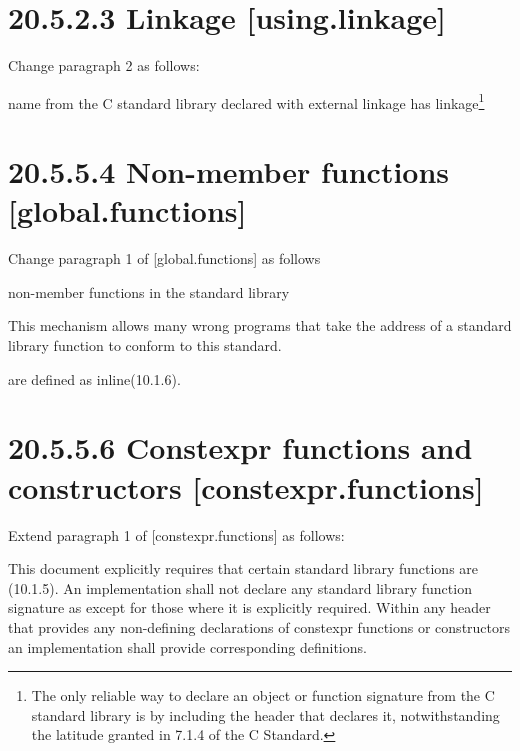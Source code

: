 \documentclass[ebook,11pt,article]{memoir}
\begin{document}
\section{20.5.2.3 Linkage [using.linkage]}
Change paragraph 2 as follows:

 name from the C standard library declared with
external linkage has
linkage\footnote{The only reliable way to declare an object or
function signature from the C standard library is by including the header that
declares it, notwithstanding the latitude granted in 7.1.4 of the C
Standard.}


\section{20.5.5.4 Non-member functions [global.functions]}

Change paragraph 1 of [global.functions] as follows

\pnum
{}
non-member
functions in the \Cpp{} standard library 
\begin{addedblock}
\begin{note}
This mechanism allows many wrong programs that take the address of a 
standard library function to conform to this standard.
\end{note}
\end{addedblock}
are defined as
inline(10.1.6).%

\section{20.5.5.6 
Constexpr functions and constructors
[constexpr.functions]}

Extend paragraph 1 of [constexpr.functions] as follows:

This document explicitly requires that certain standard library functions are
(10.1.5).
An implementation shall not declare
any standard library function signature as  except for those where
it is explicitly required.
Within any header that provides any non-defining declarations of constexpr
functions or constructors an implementation shall provide corresponding definitions.
\end{document}
